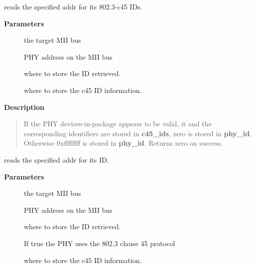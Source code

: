 \documentclass[a4paper,8pt,english]{sphinxmanual}
\begin{document}
\begin{fulllineitems}
\label{networking/kapi:c.get_phy_c45_ids}
reads the specified addr for its 802.3-c45 IDs.

\end{fulllineitems}


\textbf{Parameters}
\begin{description}
\item[{}] \leavevmode
the target MII bus

\item[{}] \leavevmode
PHY address on the MII bus

\item[{}] \leavevmode
where to store the ID retrieved.

\item[{}] \leavevmode
where to store the c45 ID information.

\end{description}

\textbf{Description}
\begin{quote}

If the PHY devices-in-package appears to be valid, it and the
corresponding identifiers are stored in \textbf{c45\_ids}, zero is stored
in \textbf{phy\_id}.  Otherwise 0xffffffff is stored in \textbf{phy\_id}.  Returns
zero on success.
\end{quote}

\begin{fulllineitems}
\label{networking/kapi:c.get_phy_id}
reads the specified addr for its ID.

\end{fulllineitems}


\textbf{Parameters}
\begin{description}
\item[{}] \leavevmode
the target MII bus

\item[{}] \leavevmode
PHY address on the MII bus

\item[{}] \leavevmode
where to store the ID retrieved.

\item[{}] \leavevmode
If true the PHY uses the 802.3 clause 45 protocol

\item[{}] \leavevmode
where to store the c45 ID information.

\end{description}
\end{document}
